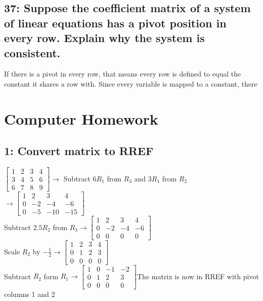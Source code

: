 \documentclass{article}
\begin{document}
\subsection*{37: Suppose the coeﬃcient matrix of a system of linear equations has a pivot position in every row. Explain why the system is consistent.}
If there is a pivot in every row, that means every row is defined to equal the constant it shares a row with. Since every variable is mapped to a constant, there
 \\
\pagebreak
\section*{Computer Homework}
\subsection*{1: Convert matrix to RREF}
$\left[\begin{array}{ccc|c}
    1 & 2 & 3 & 4 \\
    3& 4 & 5 & 6 \\
    6 & 7 & 8 & 9 
\end{array}\right]
\rightarrow$ Subtract $6R_1$ from $R_3$ and $3R_1$ from $R_2$ $\rightarrow
\left[\begin{array}{ccc|c}
    1 & 2 & 3 & 4 \\
    0 & -2 & -4 & -6 \\
    0 & -5 & -10 & -15 
\end{array}\right]$ \\[0.1in] Subtract $2.5R_2$ from $R_3 \rightarrow
\left[\begin{array}{ccc|c}
    1 & 2 & 3 & 4 \\
    0 & -2 & -4 & -6 \\
    0 & 0 & 0 & 0 
\end{array}\right]$ \\[0.1in] Scale $R_2$ by $-\frac{1}{2} \rightarrow
\left[\begin{array}{ccc|c}
    1 & 2 & 3 & 4 \\
    0 & 1 & 2 & 3 \\
    0 & 0 & 0 & 0 
\end{array}\right]
$\\[0.1in] Subtract $R_2$ form $R_1\rightarrow
\boxed{\left[\begin{array}{ccc|c}
    1 & 0 & -1 & -2 \\
    0 & 1 & 2 & 3 \\
    0 & 0 & 0 & 0 
\end{array}\right]}
$The matrix is now in RREF with pivot columns 1 and 2
\end{document}
